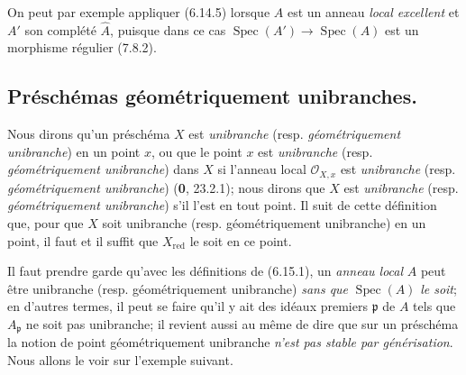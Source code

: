 On peut par exemple appliquer (6.14.5) lorsque $A$ est un anneau \emph{local
excellent} et $A'$ son complété $\widehat A$, puisque dans ce cas
$\operatorname{Spec}(A')\to\operatorname{Spec}(A)$ est un morphisme
régulier (7.8.2).

\subsection{Préschémas géométriquement unibranches.}
\label{IV.2.s6.15-fr}

\begin{env}[6.15.1]
\label{IV.2.s6.15.1-fr}
Nous dirons qu'un préschéma $X$ est \emph{unibranche} (resp.
\emph{géométriquement unibranche}) en un point $x$, ou que le point $x$
est \emph{unibranche} (resp. \emph{géométriquement unibranche}) dans $X$ si l'anneau
local $\mathcal O_{X,x}$ est \emph{unibranche} (resp. \emph{géométriquement
unibranche}) (\textbf{0}, 23.2.1); nous dirons que $X$ est \emph{unibranche} (resp.
\emph{géométriquement unibranche}) s'il l'est en tout point. Il suit de cette
définition que, pour que $X$ soit unibranche (resp. géométriquement
unibranche) en un point, il faut et il suffit que $X_{\mathrm{red}}$ le soit
en ce point.
\end{env}

\begin{env}[6.15.2]
Il faut prendre garde qu'avec les définitions de (6.15.1), un \emph{anneau local}
$A$ peut être unibranche (resp. géométriquement unibranche) \emph{sans que}
$\operatorname{Spec}(A)$ \emph{le soit}; en d'autres termes, il peut se faire qu'il
y ait des idéaux premiers $\mathfrak p$ de $A$ tels que $A_\mathfrak p$ ne
soit pas unibranche; il revient aussi au même de dire que sur un préschéma
la notion de point géométriquement unibranche \emph{n'est pas stable par
générisation}. Nous allons le voir sur l'exemple suivant.
\end{env}

